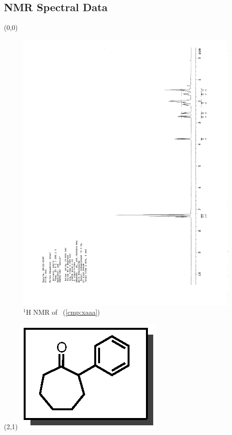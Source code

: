 \subsection{NMR Spectral Data}


\begin{textblock}{20}(0,0)
\begin{figure}[htb]
\caption{$^1$H NMR of \CMPxaaa\ (\ref{cmp:xaaa})}
\includegraphics[scale=0.75, trim = 0mm 0mm 0mm 5mm,
clip]{chp_asymmetric/images/nmr/xaaaH}
\vspace{-100pt}
\end{figure}
\end{textblock}
\begin{textblock}{1}(2,1)
\includegraphics[scale=0.8, angle=90]{chp_asymmetric/images/xaaa}
\end{textblock}
